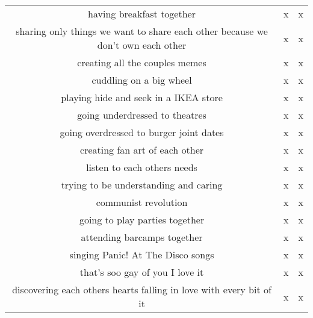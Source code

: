 \documentclass[a4paper]{article}
\begin{document}
\begin{table}[htb]
\begin{tabular}{@{}ccc@{}}
        having breakfast together &  x &  x \\
        sharing only things we want to share each other because we don't own each other &  x &  x \\
        creating all the couples memes &  x &  x \\
        cuddling on a big wheel &  x &  x \\
        playing hide and seek in a IKEA store &  x &  x \\
        going underdressed to theatres &  x &  x \\
        going overdressed to burger joint dates &  x &  x \\
        creating fan art of each other &  x &  x \\
        listen to each others needs &  x &  x \\
        trying to be understanding and caring &  x &  x \\
        communist revolution &  x &  x \\
        going to play parties together &  x &  x \\
        attending barcamps together &  x &  x \\
        singing Panic! At The Disco songs &  x &  x \\
        that's soo gay of you I love it &  x &  x \\
        discovering each others hearts falling in love with every bit of it &  x &  x \\
        \bottomrule
    \end{tabular}
\end{table}
\end{document}
